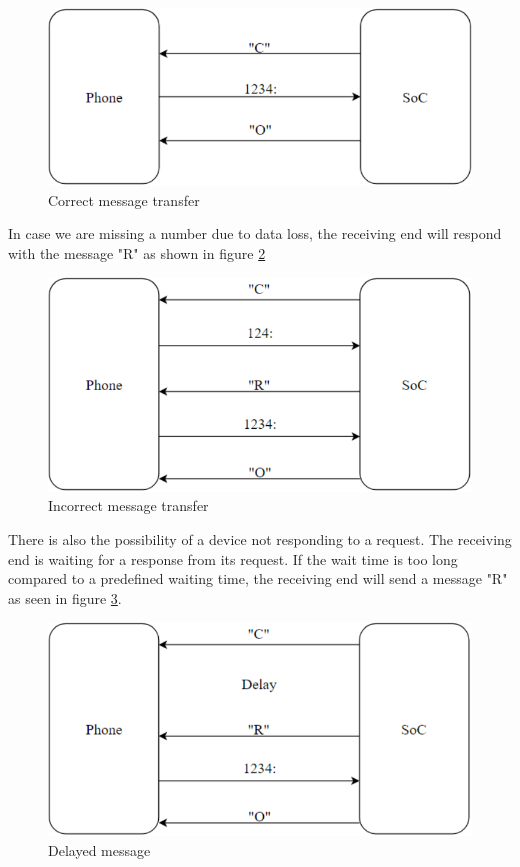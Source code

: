 \documentclass[a4paper, 11pt]{report}
\begin{document}
\begin{figure}[ht]
\centering
\includegraphics[scale=0.7]{images/CorrectMsg.pdf}
\caption{Correct message transfer}\label{fig:correctMessage}
\end{figure}

In case we are missing a number due to data loss, the receiving end will respond with the message "R" as shown in figure \ref{fig:incorrectMessage}

\begin{figure}[ht]
\centering
\includegraphics[scale=0.7]{images/IncorrectMsg.pdf}
\caption{Incorrect message transfer}\label{fig:incorrectMessage}
\end{figure}

There is also the possibility of a device not responding to a request. The receiving end is waiting for a response from its request. If the wait time is too long compared to a predefined waiting time, the receiving end will send a message "R" as seen in figure \ref{fig:delayedMessage}.

\begin{figure}[ht]
\centering
\includegraphics[scale=0.7]{images/DelayedMsg.pdf}
\caption{Delayed message}\label{fig:delayedMessage}
\end{figure}
\end{document}
